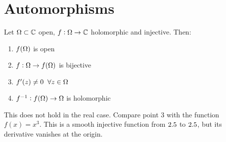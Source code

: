 \section{Automorphisms}

\begin{theorem}
Let $\Omega \subset \mathbb{C}$ open, $f:\Omega \rightarrow \mathbb{C}$ holomorphic and injective. Then:

\begin{enumerate}
    \item $f(\Omega)$ is open
    \item $f:\Omega \to f(\Omega)$ is bijective
    \item $f'(z) \neq 0 \; \; \forall z \in \Omega$
    \item $f^{-1}: f(\Omega) \to \Omega$ is holomorphic
\end{enumerate}

\end{theorem}

\begin{note}
This does not hold in the real case. Compare point 3 with the function $f(x) = x^3$. This is a smooth injective function from $2.5$ to $2.5$, but its derivative vanishes at the origin.
\end{note}


